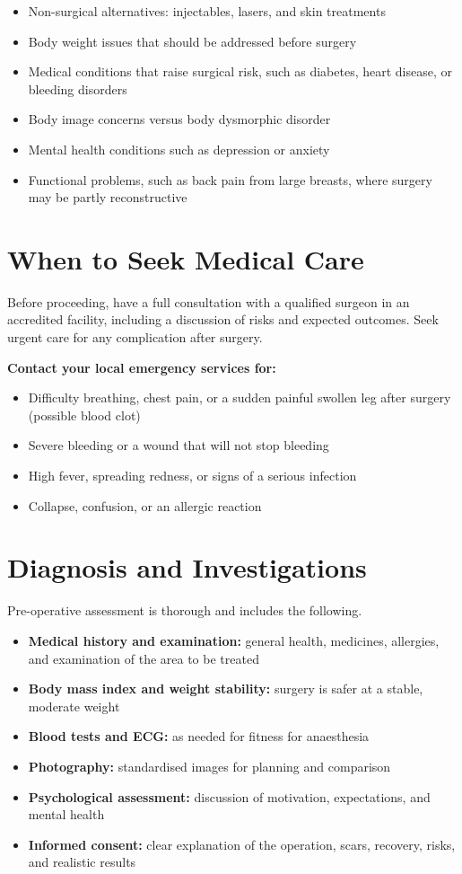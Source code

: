 \begin{itemize}
    \item Non-surgical alternatives: injectables, lasers, and skin treatments
    \item Body weight issues that should be addressed before surgery
    \item Medical conditions that raise surgical risk, such as diabetes, heart disease, or bleeding disorders
    \item Body image concerns versus body dysmorphic disorder
    \item Mental health conditions such as depression or anxiety
    \item Functional problems, such as back pain from large breasts, where surgery may be partly reconstructive
\end{itemize}

\section*{When to Seek Medical Care}
Before proceeding, have a full consultation with a qualified surgeon in an accredited facility, including a discussion of risks and expected outcomes. Seek urgent care for any complication after surgery.

\textbf{Contact your local emergency services for:}
\begin{itemize}
    \item Difficulty breathing, chest pain, or a sudden painful swollen leg after surgery (possible blood clot)
    \item Severe bleeding or a wound that will not stop bleeding
    \item High fever, spreading redness, or signs of a serious infection
    \item Collapse, confusion, or an allergic reaction
\end{itemize}

\section*{Diagnosis and Investigations}
Pre-operative assessment is thorough and includes the following.

\begin{itemize}
    \item \textbf{Medical history and examination:} general health, medicines, allergies, and examination of the area to be treated
    \item \textbf{Body mass index and weight stability:} surgery is safer at a stable, moderate weight
    \item \textbf{Blood tests and ECG:} as needed for fitness for anaesthesia
    \item \textbf{Photography:} standardised images for planning and comparison
    \item \textbf{Psychological assessment:} discussion of motivation, expectations, and mental health
    \item \textbf{Informed consent:} clear explanation of the operation, scars, recovery, risks, and realistic results
\end{itemize}

